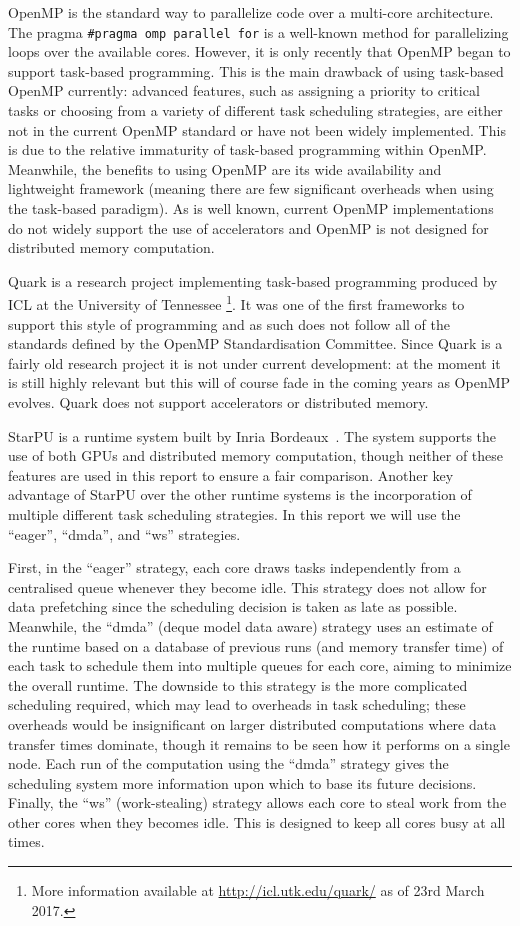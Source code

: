 \documentclass[a4paper,12pt]{article}
\begin{document}
OpenMP is the standard way to parallelize code over a
multi-core architecture.  The pragma
\texttt{\#pragma omp parallel for}
is a well-known method for parallelizing loops
over the available cores.
However, it is only recently that OpenMP
began to support task-based programming.  This is the main drawback of
using task-based OpenMP currently: advanced features, such as
assigning a priority to critical tasks or choosing from a variety of
different task scheduling strategies, are either not in the current
OpenMP standard or have not been widely implemented.  This is due to
the relative immaturity of task-based programming within OpenMP.
Meanwhile, the benefits to using OpenMP are its wide availability and
lightweight framework (meaning there are few significant overheads
when using the task-based paradigm).  As is well known, current
OpenMP implementations do not widely support the use of accelerators
and OpenMP is not designed for distributed memory computation.

Quark is a research project implementing task-based programming
produced by ICL at the University of Tennessee%
\footnote{More information available at
  \url{http://icl.utk.edu/quark/} as of 23rd March 2017.}.
It was one of the first frameworks to support this style
of programming and as such does not follow all of the standards
defined by the OpenMP Standardisation Committee.
Since Quark is a fairly old research project it is not under current
development:
at the moment it is still highly relevant but this will of course fade
in the coming years as OpenMP evolves.
Quark does not support accelerators or distributed memory.

StarPU is a runtime system built by Inria Bordeaux~\cite{starpu11}.
The system supports the use of both GPUs and
distributed memory computation,
though neither of these features are used in this report
to ensure a fair comparison.
Another key advantage of StarPU over the other runtime systems
is the incorporation of multiple different task scheduling strategies.
In this report we will use the ``eager'', ``dmda'', and ``ws''
strategies.

First,
in the ``eager'' strategy,
each core draws tasks independently from a centralised queue
whenever they become idle.
This strategy does not allow for data prefetching since the scheduling
decision is taken as late as possible.
Meanwhile, the ``dmda'' (deque model data aware) strategy
uses an estimate of the runtime based on a database of previous runs
(and memory transfer time) of each task to schedule them into
multiple queues for each core,
aiming to minimize the overall runtime.
The downside to this strategy is the more complicated scheduling required,
which may lead to overheads in task scheduling;
these overheads would be insignificant on larger distributed computations
where data transfer times dominate,
though it remains to be seen how it performs on a single node.
Each run of the computation using the ``dmda'' strategy
gives the scheduling system more information
upon which to base its future decisions.
Finally,
the ``ws'' (work-stealing) strategy allows each core to
steal work from the other cores when they becomes idle.
This is designed to keep all cores busy at all times.
\end{document}
